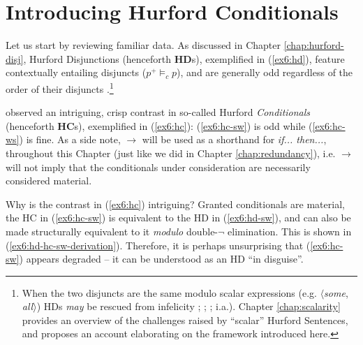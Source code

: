 \section{Introducing Hurford Conditionals}

Let us start by reviewing familiar data. As discussed in Chapter \ref{chap:hurford-disj}, Hurford Disjunctions (henceforth \textbf{HD}s), exemplified in (\ref{ex6:hd}), feature contextually entailing disjuncts ($p^+ \vDash_c p$), and are generally odd regardless of the order of their disjuncts \parencite{Hurford1974}.\footnote{When the two disjuncts are the same modulo scalar expressions (e.g. $\langle$\textit{some}, \textit{all}$\rangle$) HDs \textit{may} be rescued from infelicity ; ; ;  i.a.). Chapter \ref{chap:scalarity} provides an overview of the challenges raised by ``scalar'' Hurford Sentences, and proposes an account elaborating on the framework introduced here.}

\begin{exe}
	\ex \label{ex6:hd}
	\begin{xlist}
		\label{ex6:hd-sw}
		\label{ex6:hd-ws}
	\end{xlist}
\end{exe}

\textcite{Mandelkern2018} observed an intriguing, crisp contrast in so-called Hurford \textit{Conditionals} (henceforth \textbf{HC}s), exemplified in (\ref{ex6:hc}): (\ref{ex6:hc-sw}) is odd while (\ref{ex6:hc-ws}) is fine. As a side note, $\rightarrow$ will be used as a shorthand for \textit{if... then...}, throughout this Chapter (just like we did in Chapter \ref{chap:redundancy}), i.e. $\rightarrow$ will not imply that the conditionals under consideration are necessarily considered material.

\begin{exe}
	\ex \label{ex6:hc}
	\begin{xlist}
		\label{ex6:hc-sw}
		\label{ex6:hc-ws}
	\end{xlist}
\end{exe}

Why is the contrast in (\ref{ex6:hc}) intriguing? Granted conditionals are material, the HC in (\ref{ex6:hc-sw}) is equivalent to the HD in (\ref{ex6:hd-sw}), and can also be made structurally equivalent to it \textit{modulo} double-$\neg$ elimination. This is shown in (\ref{ex6:hd-hc-sw-derivation}). Therefore, it is perhaps unsurprising that (\ref{ex6:hc-sw}) appears degraded -- it can be understood as an HD ``in disguise''.

